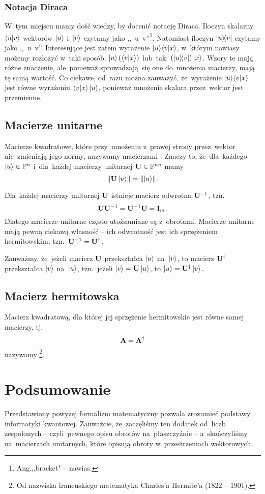\subsubsection{Notacja Diraca}
W~tym miejscu mamy dość wiedzy, by docenić notację Diraca. Iloczyn skalarny
$\braket{u}{v}$ wektorów $\ket{u}$ i~$\ket{v}$ czytamy jako
,,~u~v''\footnote{Ang.,,bracket" -- nawias.}.
Natomiast iloczyn $\ketbra{u}{v}$ czytamy jako
,,~u~v''. Interesujące jest zatem wyrażenie
$\ket{u}\!\braket{v}{x}$, w~którym nawiasy możemy rozłożyć w~taki sposób:
$\ket{u}(\braket{v}{x})$ lub~tak: $(\ketbra{u}{v})\ket{x}$. Wzory te mają różne
znaczenie, ale~ponieważ sprowadzają~się one do~mnożenia macierzy, mają tę samą
wartość. Co ciekawe, od~razu można zauważyć, że~wyrażenie
$\ket{u}\!\braket{v}{x}$ jest równe wyrażeniu $\braket{v}{x}\ket{u}$, ponieważ
mnożenie skalara przez~wektor jest przemienne.


\subsection{Macierze unitarne}
Macierze kwadratowe, które przy~mnożeniu z~prawej strony przez~wektor
nie~zmieniają jego normy, nazywamy macierzami
.
Znaczy to, że~dla~każdego $\ket{u}\in \mathbb{F}^{n}$ i~dla~każdej macierzy
unitarnej $\mathbf{U}\in \mathbb{F}^{nn}$ mamy
$$
	\norm{\mathbf{U}\ket{u}}=\norm{\ket{u}}.
$$

Dla~każdej macierzy unitarnej $\mathbf{U}$ istnieje macierz odwrotna $\mathbf{U}^{-1}$, tzn.
$$
	\mathbf{U}\mathbf{U}^{-1} = \mathbf{U}^{-1}\mathbf{U} = \mathbf{I}_m.
$$
Dlatego macierze unitarne często utożsamiane są z~obrotami.
Macierze unitarne mają pewną ciekawą własność -- ich odwrotność jest ich
sprzężeniem hermitowskim, tzn.~$\mathbf{U}^{-1} = \mathbf{U}^\dagger$.

Zauważmy, że~jeżeli macierz $\mathbf{U}$ przekształca $\ket{u}$ na~$\ket{v}$, to
macierz $\mathbf{U}^\dagger$ przekształca $\ket{v}$ na~$\ket{u}$, tzn.~jeżeli
$\ket{v} = \mathbf{U}\ket{u}$, to $\ket{u} = \mathbf{U}^\dagger\ket{v}.$

\subsection{Macierz hermitowska}
Macierz kwadratową, dla której jej sprzężenie hermitowskie jest równe samej macierzy, tj.
$$
	\mathbf{A} = \mathbf{A}^\dagger
$$
nazywamy \footnote{Od nazwiska francuskiego matematyka Charles'a Hermite'a (1822 -- 1901).}.

\section{Podsumowanie}
Przedstawiony powyżej formalizm matematyczny pozwala zrozumieć podstawy
informatyki kwantowej.
Zauważcie, że~zaczęliśmy ten dodatek od~liczb zespolonych -- czyli~pewnego opisu
obrotów na~płaszczyźnie -- a~skończyliśmy na~macierzach unitarnych, które opisują
obroty w~przestrzeniach wektorowych.
